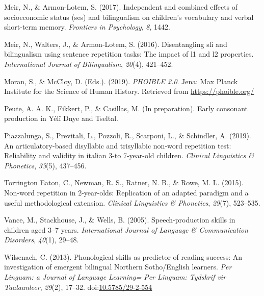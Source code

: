 \documentclass[english,,man,floatsintext]{apa6}
\begin{document}
\hypertarget{ref-meir2017independent}{}
Meir, N., \& Armon-Lotem, S. (2017). Independent and combined effects of
socioeconomic status (ses) and bilingualism on children's vocabulary and
verbal short-term memory. \emph{Frontiers in Psychology}, \emph{8},
1442.

\hypertarget{ref-meir2016disentangling}{}
Meir, N., Walters, J., \& Armon-Lotem, S. (2016). Disentangling sli and
bilingualism using sentence repetition tasks: The impact of l1 and l2
properties. \emph{International Journal of Bilingualism}, \emph{20}(4),
421--452.

\hypertarget{ref-phoible}{}
Moran, S., \& McCloy, D. (Eds.). (2019). \emph{PHOIBLE 2.0}. Jena: Max
Planck Institute for the Science of Human History. Retrieved from
\url{https://phoible.org/}

\hypertarget{ref-peuteIPconsonants}{}
Peute, A. A. K., Fikkert, P., \& Casillas, M. (In preparation). Early
consonant production in Yélî Dnye and Tseltal.

\hypertarget{ref-piazzalunga2019articulatory}{}
Piazzalunga, S., Previtali, L., Pozzoli, R., Scarponi, L., \& Schindler,
A. (2019). An articulatory-based disyllabic and trisyllabic non-word
repetition test: Reliability and validity in italian 3-to 7-year-old
children. \emph{Clinical Linguistics \& Phonetics}, \emph{33}(5),
437--456.

\hypertarget{ref-torrington2015non}{}
Torrington Eaton, C., Newman, R. S., Ratner, N. B., \& Rowe, M. L.
(2015). Non-word repetition in 2-year-olds: Replication of an adapted
paradigm and a useful methodological extension. \emph{Clinical
Linguistics \& Phonetics}, \emph{29}(7), 523--535.

\hypertarget{ref-vance2005speech}{}
Vance, M., Stackhouse, J., \& Wells, B. (2005). Speech-production skills
in children aged 3--7 years. \emph{International Journal of Language \&
Communication Disorders}, \emph{40}(1), 29--48.

\hypertarget{ref-wilsenach2013phonological}{}
Wilsenach, C. (2013). Phonological skills as predictor of reading
success: An investigation of emergent bilingual Northern Sotho/English
learners. \emph{Per Linguam: a Journal of Language Learning= Per
Linguam: Tydskrif vir Taalaanleer}, \emph{29}(2), 17--32.
doi:\href{https://doi.org/10.5785/29-2-554}{10.5785/29-2-554}
\end{document}
